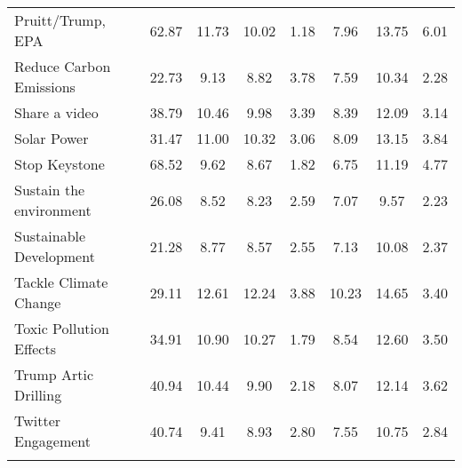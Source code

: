 \begin{longtable}{L|ccccccc}
  Pruitt/Trump, EPA & 62.87 & 11.73 & 10.02 & 1.18 & 7.96 & 13.75 & 6.01 \\ 
  Reduce Carbon Emissions & 22.73 & 9.13 & 8.82 & 3.78 & 7.59 & 10.34 & 2.28 \\ 
  Share a video & 38.79 & 10.46 & 9.98 & 3.39 & 8.39 & 12.09 & 3.14 \\ 
  Solar Power & 31.47 & 11.00 & 10.32 & 3.06 & 8.09 & 13.15 & 3.84 \\ 
  Stop Keystone & 68.52 & 9.62 & 8.67 & 1.82 & 6.75 & 11.19 & 4.77 \\ 
  Sustain the environment & 26.08 & 8.52 & 8.23 & 2.59 & 7.07 & 9.57 & 2.23 \\ 
  Sustainable Development & 21.28 & 8.77 & 8.57 & 2.55 & 7.13 & 10.08 & 2.37 \\ 
  Tackle Climate Change & 29.11 & 12.61 & 12.24 & 3.88 & 10.23 & 14.65 & 3.40 \\ 
  Toxic Pollution Effects & 34.91 & 10.90 & 10.27 & 1.79 & 8.54 & 12.60 & 3.50 \\ 
  Trump Artic Drilling & 40.94 & 10.44 & 9.90 & 2.18 & 8.07 & 12.14 & 3.62 \\ 
  Twitter Engagement & 40.74 & 9.41 & 8.93 & 2.80 & 7.55 & 10.75 & 2.84 \\ 
  \hline
\label{tab:DailyAttNGO}
\end{longtable}
